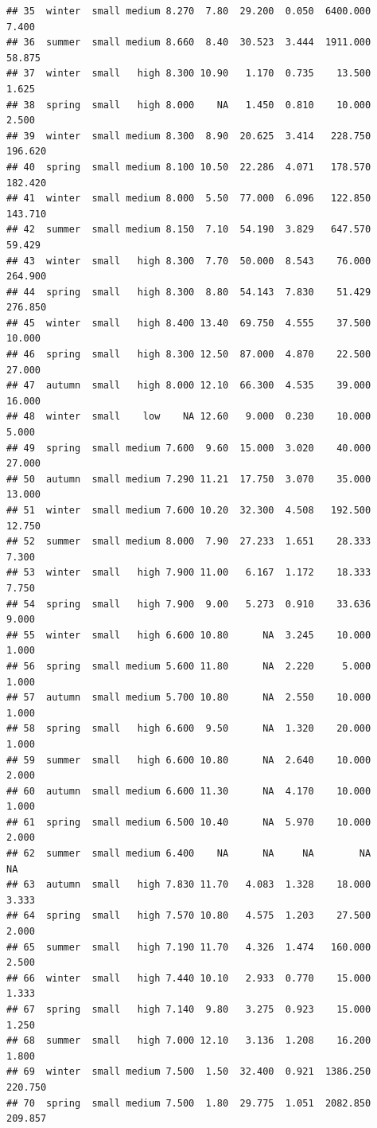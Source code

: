 \documentclass[]{report}
\begin{document}
\begin{verbatim}
## 35  winter  small medium 8.270  7.80  29.200  0.050  6400.000   7.400
## 36  summer  small medium 8.660  8.40  30.523  3.444  1911.000  58.875
## 37  winter  small   high 8.300 10.90   1.170  0.735    13.500   1.625
## 38  spring  small   high 8.000    NA   1.450  0.810    10.000   2.500
## 39  winter  small medium 8.300  8.90  20.625  3.414   228.750 196.620
## 40  spring  small medium 8.100 10.50  22.286  4.071   178.570 182.420
## 41  winter  small medium 8.000  5.50  77.000  6.096   122.850 143.710
## 42  summer  small medium 8.150  7.10  54.190  3.829   647.570  59.429
## 43  winter  small   high 8.300  7.70  50.000  8.543    76.000 264.900
## 44  spring  small   high 8.300  8.80  54.143  7.830    51.429 276.850
## 45  winter  small   high 8.400 13.40  69.750  4.555    37.500  10.000
## 46  spring  small   high 8.300 12.50  87.000  4.870    22.500  27.000
## 47  autumn  small   high 8.000 12.10  66.300  4.535    39.000  16.000
## 48  winter  small    low    NA 12.60   9.000  0.230    10.000   5.000
## 49  spring  small medium 7.600  9.60  15.000  3.020    40.000  27.000
## 50  autumn  small medium 7.290 11.21  17.750  3.070    35.000  13.000
## 51  winter  small medium 7.600 10.20  32.300  4.508   192.500  12.750
## 52  summer  small medium 8.000  7.90  27.233  1.651    28.333   7.300
## 53  winter  small   high 7.900 11.00   6.167  1.172    18.333   7.750
## 54  spring  small   high 7.900  9.00   5.273  0.910    33.636   9.000
## 55  winter  small   high 6.600 10.80      NA  3.245    10.000   1.000
## 56  spring  small medium 5.600 11.80      NA  2.220     5.000   1.000
## 57  autumn  small medium 5.700 10.80      NA  2.550    10.000   1.000
## 58  spring  small   high 6.600  9.50      NA  1.320    20.000   1.000
## 59  summer  small   high 6.600 10.80      NA  2.640    10.000   2.000
## 60  autumn  small medium 6.600 11.30      NA  4.170    10.000   1.000
## 61  spring  small medium 6.500 10.40      NA  5.970    10.000   2.000
## 62  summer  small medium 6.400    NA      NA     NA        NA      NA
## 63  autumn  small   high 7.830 11.70   4.083  1.328    18.000   3.333
## 64  spring  small   high 7.570 10.80   4.575  1.203    27.500   2.000
## 65  summer  small   high 7.190 11.70   4.326  1.474   160.000   2.500
## 66  winter  small   high 7.440 10.10   2.933  0.770    15.000   1.333
## 67  spring  small   high 7.140  9.80   3.275  0.923    15.000   1.250
## 68  summer  small   high 7.000 12.10   3.136  1.208    16.200   1.800
## 69  winter  small medium 7.500  1.50  32.400  0.921  1386.250 220.750
## 70  spring  small medium 7.500  1.80  29.775  1.051  2082.850 209.857

\end{verbatim}
\end{document}
